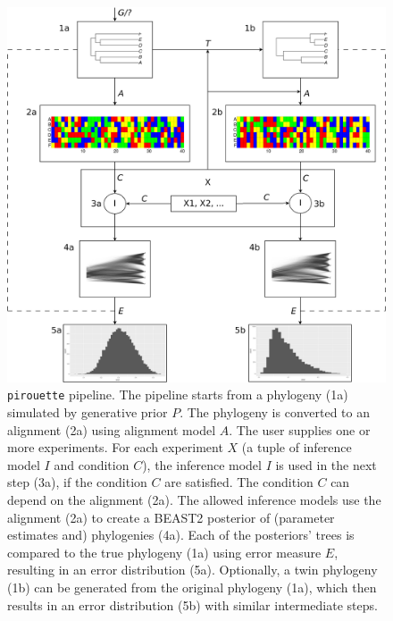 \documentclass{article}
\begin{document}
\begin{figure}
  \centering
  \includegraphics[width=\textwidth]{workflow.png}
  \caption{
    \texttt{pirouette} pipeline. 
    The pipeline starts from a phylogeny (1a) simulated by generative prior $\mathit{P}$.
    The phylogeny is converted to an alignment (2a) using alignment model $\mathit{A}$. 
    The user supplies one or more experiments.
    For each experiment $\mathit{X}$ (a tuple of inference model $\mathit{I}$ and condition $\mathit{C}$),
    the inference model $\mathit{I}$ is used in the next step (3a),
    if the condition $\mathit{C}$ are satisfied.
    The condition $\mathit{C}$ can depend on the alignment (2a).
    The allowed inference models use the alignment (2a) 
    to create a BEAST2 posterior of (parameter estimates and) phylogenies (4a). 
    Each of the posteriors' trees is compared to the true phylogeny (1a) 
    using error measure $\mathit{E}$, 
    resulting in an error distribution (5a). 
    Optionally, a twin phylogeny (1b) can be generated from the original 
    phylogeny (1a), which then results in an error distribution (5b) 
    with similar intermediate steps.
  }
  \label{fig:pipeline}
\end{figure}
\end{document}
